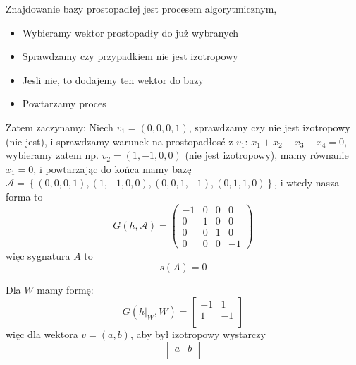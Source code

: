 \documentclass[11pt]{scrartcl}
\begin{document}
          \begin{walk}
              \item Znajdowanie bazy prostopadłej jest procesem algorytmicznym,
                \begin{itemize}
                    \item Wybieramy wektor prostopadły do już wybranych
                    \item Sprawdzamy czy przypadkiem nie jest izotropowy 
                    \item Jesli nie, to dodajemy ten wektor do bazy
                    \item Powtarzamy proces
                \end{itemize}
                
                Zatem zaczynamy:
                Niech $v_1 = (0,0,0,1)$, sprawdzamy czy nie jest izotropowy (nie jest), i sprawdzamy warunek na prostopadłosć z $v_1$: $x_{1} + x_2 - x_3 - x_4 = 0$, wybieramy zatem np. $v_2 = (1, -1, 0, 0)$ (nie jest izotropowy), mamy równanie $x_1 = 0$, i powtarzając do końca mamy bazę $\mathcal{A} = \left \{ \left ( 0,0,0,1 \right ), \left ( 1,-1,0,0 \right ), \left ( 0,0,1,-1 \right ), \left ( 0,1,1,0 \right ) \right \} $, i wtedy nasza forma to 
                \[
                    G(h, \mathcal{A} ) = 
                    \begin{pmatrix}
                      -1 & 0 & 0 & 0 \\
                      0  & 1 & 0 & 0 \\
                      0 &  0 & 1 & 0 \\
                      0 & 0 & 0 & -1
                    \end{pmatrix}
                \]
                więc sygnatura $A$ to 
                \[
                    s(A) = 0
                \]
            \item Dla $W$ mamy formę:
              \[
                G(h\big|_{W}, W) = 
                \begin{bmatrix}
                    -1 & 1 \\
                    1 & -1 \\
                \end{bmatrix}
              \]
              więc dla wektora $v = (a,b)$, aby był izotropowy wystarczy
              \[
                  \begin{bmatrix}
                      a & b \\
                  \end{bmatrix}
\]
\end{walk}
\end{document}
